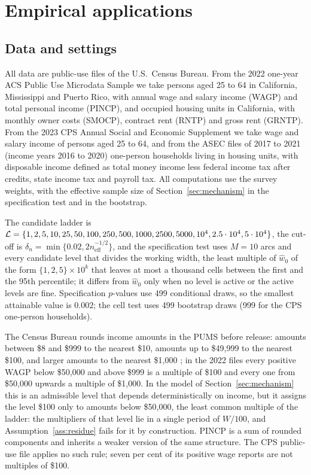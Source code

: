 \section{Empirical applications}\label{sec:data}

\subsection{Data and settings}

All data are public-use files of the U.S.\ Census Bureau. From the 2022 one-year ACS Public Use Microdata Sample we take persons aged 25 to 64 in California, Mississippi and Puerto Rico, with annual wage and salary income (WAGP) and total personal income (PINCP), and occupied housing units in California, with monthly owner costs (SMOCP), contract rent (RNTP) and gross rent (GRNTP). From the 2023 CPS Annual Social and Economic Supplement we take wage and salary income of persons aged 25 to 64, and from the ASEC files of 2017 to 2021 (income years 2016 to 2020) one-person households living in housing units, with disposable income defined as total money income less federal income tax after credits, state income tax and payroll tax. All computations use the survey weights, with the effective sample size of Section~\ref{sec:mechanism} in the specification test and in the bootstrap.

The candidate ladder is $\mathcal{L}=\{1,\allowbreak 2,\allowbreak 5,\allowbreak 10,\allowbreak 25,\allowbreak 50,\allowbreak 100,\allowbreak 250,\allowbreak 500,\allowbreak 1000,\allowbreak 2500,\allowbreak 5000,\allowbreak 10^4,\allowbreak 2.5\cdot10^4,\allowbreak 5\cdot10^4\}$, the cut-off is $\delta_n=\min\{0.02,2n_{\mathrm{eff}}^{-1/2}\}$, and the specification test uses $M=10$ arcs and every candidate level that divides the working width, the least multiple of $\hat w_0$ of the form $\{1,\allowbreak 2,\allowbreak 5\}\times10^k$ that leaves at most a thousand cells between the first and the 95th percentile; it differs from $\hat w_0$ only when no level is active or the active levels are fine. Specification $p$-values use 499 conditional draws, so the smallest attainable value is $0.002$; the cell test uses 499 bootstrap draws (999 for the CPS one-person households).

The Census Bureau rounds income amounts in the PUMS before release: amounts between \$8 and \$999 to the nearest \$10, amounts up to \$49{,}999 to the nearest \$100, and larger amounts to the nearest \$1{,}000 \citep{ACSPUMS2023}; in the 2022 files every positive WAGP below \$50{,}000 and above \$999 is a multiple of \$100 and every one from \$50{,}000 upwards a multiple of \$1{,}000. In the model of Section~\ref{sec:mechanism} this is an admissible level that depends deterministically on income, but it assigns the level \$100 only to amounts below \$50{,}000, the least common multiple of the ladder: the multipliers of that level lie in a single period of $W/100$, and Assumption~\ref{ass:residue} fails for it by construction. PINCP is a sum of rounded components and inherits a weaker version of the same structure. The CPS public-use file applies no such rule; seven per cent of its positive wage reports are not multiples of \$100.

